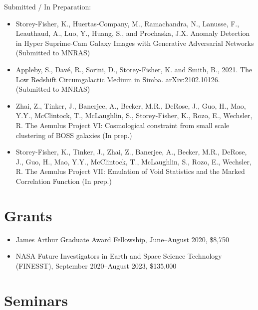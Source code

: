 \documentclass{article}
\begin{document}
Submitted / In Preparation:
\begin{itemize}
\item Storey-Fisher, K., Huertas-Company, M., Ramachandra, N., Lanusse, F., Leauthaud, A., Luo, Y., Huang, S., and Prochaska, J.X. Anomaly Detection in Hyper Suprime-Cam Galaxy Images with Generative Adversarial Networks (Submitted to MNRAS)
\item Appleby, S., Davé, R., Sorini, D., Storey-Fisher, K. and Smith, B., 2021. The Low Redshift Circumgalactic Medium in Simba. arXiv:2102.10126. (Submitted to MNRAS)
\item Zhai, Z., Tinker, J., Banerjee, A., Becker, M.R., DeRose, J., Guo, H., Mao, Y.Y., McClintock, T., McLaughlin, S.,  Storey-Fisher, K., Rozo, E., Wechsler, R. The Aemulus Project VI: Cosmological constraint from small scale clustering of BOSS galaxies (In prep.)
\item Storey-Fisher, K., Tinker, J., Zhai, Z., Banerjee, A., Becker, M.R., DeRose, J., Guo, H., Mao, Y.Y., McClintock, T., McLaughlin, S., Rozo, E., Wechsler, R. The Aemulus Project VII: Emulation of Void Statistics and the Marked Correlation Function (In prep.)
\end{itemize}

\section{Grants}

\begin{itemize}
\item James Arthur Graduate Award Fellowship, June--August 2020, \$8,750
\item NASA Future Investigators in Earth and Space Science Technology (FINESST), September 2020--August 2023, \$135,000
\end{itemize}

\section{Seminars}
\end{document}
